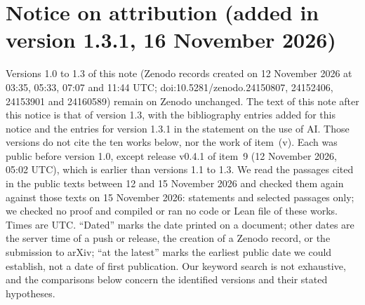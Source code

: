 \documentclass[11pt,a4paper]{article}
\theoremstyle{plain}
\theoremstyle{definition}
\theoremstyle{remark}
\numberwithin{equation}{section}
\begin{document}
\section*{Notice on attribution (added in version 1.3.1, 16 November 2026)}\label{sec:notice}
\begingroup\footnotesize\setlength{\parindent}{0pt}\setlength{\parskip}{2pt}\setlength{\emergencystretch}{3em}
\newcommand{\nitem}[1]{\par\noindent\hangindent=1.3em\hangafter=1 \makebox[1.3em][l]{#1}}
Versions 1.0 to 1.3 of this note (Zenodo records created on 12 November 2026 at 03:35, 05:33, 07:07 and 11:44 UTC;
doi:10.5281/zenodo.24150807, 24152406, 24153901 and 24160589) remain on Zenodo unchanged. The text of this note after this
notice is that of version 1.3, with the bibliography entries added for this notice and the entries for version 1.3.1 in the statement on the use of AI. Those versions do not cite the ten works below, nor the work of item~(v). Each was public before version 1.0, except release v0.4.1 of item~9 (12 November 2026, 05:02 UTC), which is earlier than versions 1.1 to 1.3.
We read the passages cited in the public texts between 12 and 15 November 2026 and checked them again against those texts on 15 November 2026: statements and selected
passages only; we checked no proof and compiled or ran no code or Lean file of these works. Times are UTC. ``Dated'' marks the date printed on a document; other dates are the server time of a push or release, the creation of a Zenodo record, or the submission to arXiv; ``at the latest'' marks the earliest public date we could establish, not a date of first publication. Our keyword search is not exhaustive, and the comparisons below concern the identified versions and their stated hypotheses.
\end{document}
